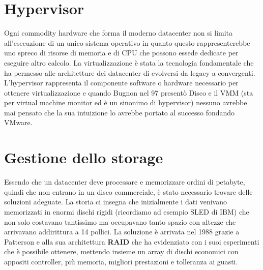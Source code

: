 \section{Hypervisor}
Ogni commodity hardware che forma il moderno datacenter non si limita all'esecuzione di un unico sistema operativo in quanto questo rappresenterebbe uno spreco di risorse di memoria e di CPU che possono essede dedicate per eseguire altro calcolo. La virtualizzazione è stata la tecnologia fondamentale che ha permesso alle architetture dei datacenter di evolversi da legacy a convergenti. L'hypervisor rappresenta il componente software o hardware necessario per ottenere virtualizzazione e quando Bugnon nel 97 presentò Disco\cite{bugnon97} e il VMM (sta per virtual machine monitor ed è un sinonimo di hypervisor) nessuno avrebbe mai pensato che la sua intuizione lo avrebbe portato al successo fondando VMware.
\section{Gestione dello storage}
Essendo che un datacenter deve processare e memorizzare ordini di petabyte, quindi che non entrano in un disco commerciale, è stato necessario trovare delle soluzioni adeguate. La storia ci insegna che inizialmente i dati venivano memorizzati in enormi dischi rigidi (ricordiamo ad esempio SLED di IBM) che non solo costavano tantissimo ma occupavano tanto spazio con altezze che arrivavano addirittura a 14 pollici. La soluzione è arrivata nel 1988 grazie a Patterson e alla sua architettura \textbf{RAID} che ha evidenziato con i suoi esperimenti\cite{patterson88} che è possibile ottenere, mettendo insieme un array di dischi economici con appositi controller, più memoria, migliori prestazioni e tolleranza ai guasti.
